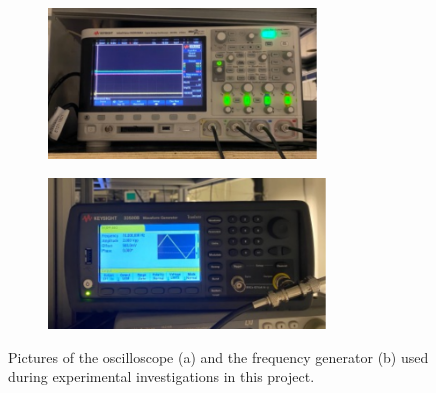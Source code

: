 \begin{figure}[h!]
    \centering
    \begin{subfigure}[b]{0.49\textwidth}
        \centering
        \includegraphics[height=4cm]{figures/scope.pdf}
        \caption{}
        \label{fig:scope}
    \end{subfigure}
    \begin{subfigure}[b]{0.49\textwidth}
        \centering
        \includegraphics[height=4cm]{figures/frequency_generator.pdf}
        \caption{}
        \label{fig:freq_generator}
    \end{subfigure}
    \caption{Pictures of the oscilloscope (a) and the frequency generator (b) used during experimental investigations in this project.}
    \label{fig:scope_and_freq_generator}
\end{figure}
